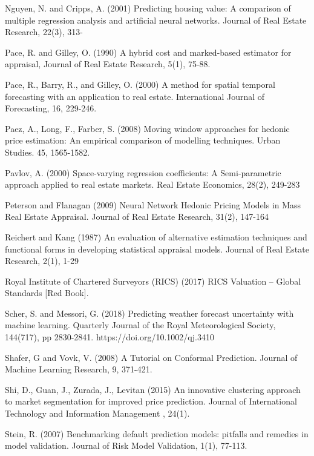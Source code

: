 \documentclass[colTwo]{anon}
\theoremstyle{definition}
\begin{document}
\begin{thebibliography}{50}
\harvarditem{}{}{}Nguyen, N. and Cripps, A. (2001) Predicting housing value: A comparison of multiple regression analysis and artificial neural networks. Journal of Real Estate Research, 22(3), 313-

\harvarditem{}{}{}Pace, R. and Gilley, O. (1990) A hybrid cost and marked-based estimator for appraisal, Journal of Real Estate Research, 5(1), 75-88. 

\harvarditem{}{}{}Pace, R., Barry, R., and Gilley, O. (2000) A method for spatial temporal forecasting with an application to real estate.  International Journal of Forecasting, 16, 229-246. 

\harvarditem{}{}{}Paez, A., Long, F., Farber, S. (2008) Moving window approaches for hedonic price estimation: An empirical comparison of modelling techniques. Urban Studies. 45, 1565-1582. 

\harvarditem{}{}{}Pavlov, A. (2000) Space-varying regression coefficients: A Semi-parametric approach applied to real estate markets. Real Estate Economics, 28(2), 249-283

\harvarditem{}{}{}Peterson and Flanagan (2009) Neural Network Hedonic Pricing Models in Mass Real Estate Appraisal. Journal of Real Estate Research,  31(2), 147-164

\harvarditem{}{}{}Reichert and Kang (1987) An evaluation of alternative estimation techniques and functional forms in developing statistical appraisal models. Journal of Real Estate Research, 2(1), 1-29

\harvarditem{}{}{}Royal Institute of Chartered Surveyors (RICS) (2017) RICS Valuation – Global Standards [Red Book]. 

\harvarditem{}{}{}Scher, S. and Messori, G. (2018) Predicting weather forecast uncertainty with machine learning. Quarterly Journal of the Royal Meteorological Society, 144(717), pp 2830-2841.  https://doi.org/10.1002/qj.3410

\harvarditem{}{}{}Shafer, G and Vovk, V. (2008) A Tutorial on Conformal Prediction. Journal of Machine Learning Research, 9, 371-421. 

\harvarditem{}{}{}Shi, D., Guan, J., Zurada, J., Levitan (2015) An innovative clustering approach to market segmentation for improved price prediction. Journal of International Technology and Information Management , 24(1).  

\harvarditem{}{}{}Stein, R. (2007) Benchmarking default prediction models: pitfalls and remedies in model validation. Journal of Risk Model Validation, 1(1), 77-113. 


\end{thebibliography}
\end{document}

